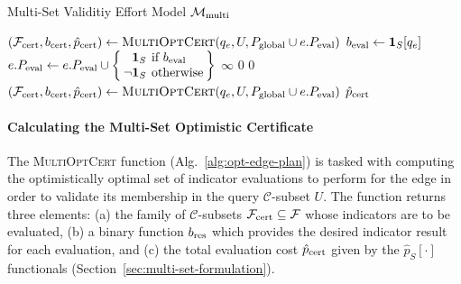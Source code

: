 \begin{algorithm}
\caption{Multi-Set Validitiy Effort Model
   $\mathcal{M}_{\mbox{\scriptsize multi}}$}
\label{alg:multi-set-effort-model}
{\algrenewcommand\textproc{}%
\begin{algorithmic}[1]
   \State $(\mathcal{F}_{\mbox{\scriptsize cert}}, b_{\mbox{\scriptsize cert}}, {\hat p}_{\mbox{\scriptsize cert}})
      \leftarrow \mbox{\sc MultiOptCert}(q_e, U,
      P_{\mbox{\scriptsize global}} \cup e.P_{\mbox{\scriptsize eval}})$
      \State $b_{\mbox{\scriptsize eval}} \leftarrow \mathbf{1}_S[q_e]$
      \State $\arraycolsep=2pt
         e.P_{\ms{eval}} \leftarrow e.P_{\ms{eval}} \cup
         \left\{\begin{array}{rl}
         \mathbf{1}_S & \mbox{if } b_{\ms{eval}} \\
         \lnot \mathbf{1}_S & \mbox{otherwise} \\
         \end{array}
         \right\}$
         \State \Return $\infty$
      \EndIf
   \EndFor
   \State \Return $0$
\EndFunction
{}
   \State \Return $0$
\EndFunction
{}
   \State $(\mathcal{F}_{\mbox{\scriptsize cert}}, b_{\mbox{\scriptsize cert}}, {\hat p}_{\mbox{\scriptsize cert}})
      \leftarrow \mbox{\sc MultiOptCert}(q_e, U,
      P_{\mbox{\scriptsize global}} \cup e.P_{\mbox{\scriptsize eval}})$
   \State \Return ${\hat p}_{\mbox{\scriptsize cert}}$
\EndFunction
\end{algorithmic}
} %
\end{algorithm}

\paragraph{Calculating the Multi-Set Optimistic Certificate}
The \textsc{MultiOptCert} function (Alg.~\ref{alg:opt-edge-plan})
is tasked with computing
the optimistically optimal set of indicator evaluations to perform
for the edge in order to validate its membership in the query
$\mathcal{C}$-subset $U$.
The function returns three elements:
(a) the family of $\mathcal{C}$-subsets
$\mathcal{F}_{\mbox{\scriptsize cert}} \subseteq \mathcal{F}$
whose indicators are to be evaluated,
(b) a binary function $b_{\mbox{\scriptsize res}}$
which provides the desired indicator result for each evaluation,
and (c) the total evaluation cost ${\hat p}_{\mbox{\scriptsize cert}}$
given by the $\hat{p}_S[\cdot]$ functionals
(Section~\ref{sec:multi-set-formulation}).

